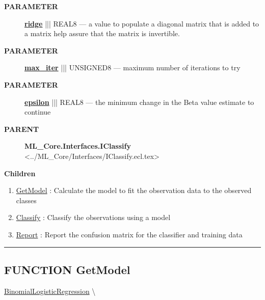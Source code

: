 \par
\begin{description}
\item [\colorbox{tagtype}{\color{white} \textbf{\textsf{PARAMETER}}}] \textbf{\underline{ridge}} ||| REAL8 --- a value to populate a diagonal matrix that is added to a matrix help assure that the matrix is invertible.
\item [\colorbox{tagtype}{\color{white} \textbf{\textsf{PARAMETER}}}] \textbf{\underline{max\_iter}} ||| UNSIGNED8 --- maximum number of iterations to try
\item [\colorbox{tagtype}{\color{white} \textbf{\textsf{PARAMETER}}}] \textbf{\underline{epsilon}} ||| REAL8 --- the minimum change in the Beta value estimate to continue
\end{description}









\par
\begin{description}
\item [\colorbox{tagtype}{\color{white} \textbf{\textsf{PARENT}}}] \textbf{ML\_Core.Interfaces.IClassify} <../ML\_Core/Interfaces/IClassify.ecl.tex>
\end{description}


\textbf{Children}
\begin{enumerate}
\item \hyperlink{ecldoc:logisticregression.binomiallogisticregression.getmodel}{GetModel}
: Calculate the model to fit the observation data to the observed classes
\item \hyperlink{ecldoc:logisticregression.binomiallogisticregression.classify}{Classify}
: Classify the observations using a model
\item \hyperlink{ecldoc:logisticregression.binomiallogisticregression.report}{Report}
: Report the confusion matrix for the classifier and training data
\end{enumerate}

\rule{\linewidth}{0.5pt}

\subsection*{\textsf{\colorbox{headtoc}{\color{white} FUNCTION}
GetModel}}

\hypertarget{ecldoc:logisticregression.binomiallogisticregression.getmodel}{}
\hspace{0pt} \hyperlink{ecldoc:logisticregression.binomiallogisticregression}{BinomialLogisticRegression} \textbackslash 

